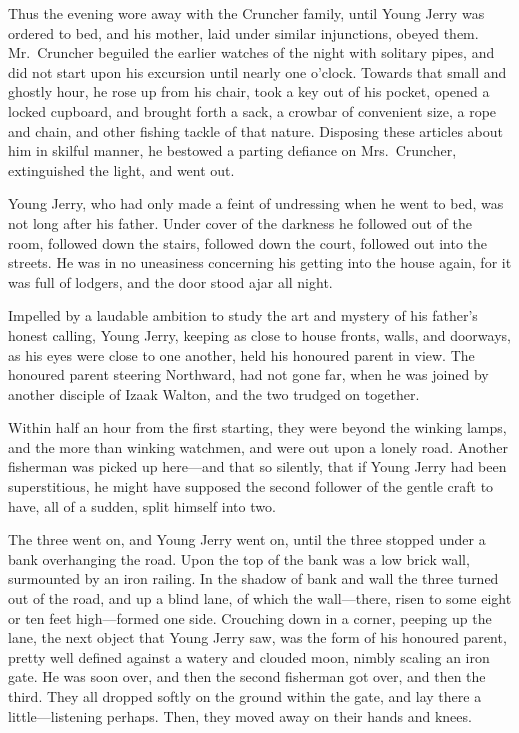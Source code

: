 Thus the evening wore away with the Cruncher family, until Young Jerry
was ordered to bed, and his mother, laid under similar injunctions,
obeyed them.  Mr.\ Cruncher beguiled the earlier watches of the night
with solitary pipes, and did not start upon his excursion until nearly
one o'clock.  Towards that small and ghostly hour, he rose up from his
chair, took a key out of his pocket, opened a locked cupboard, and
brought forth a sack, a crowbar of convenient size, a rope and chain,
and other fishing tackle of that nature.  Disposing these articles about
him in skilful manner, he bestowed a parting defiance on Mrs.\ Cruncher,
extinguished the light, and went out.

Young Jerry, who had only made a feint of undressing when he went to bed,
was not long after his father.  Under cover of the darkness he followed
out of the room, followed down the stairs, followed down the court,
followed out into the streets.  He was in no uneasiness concerning
his getting into the house again, for it was full of lodgers, and the
door stood ajar all night.

Impelled by a laudable ambition to study the art and mystery of his
father's honest calling, Young Jerry, keeping as close to house fronts,
walls, and doorways, as his eyes were close to one another, held his
honoured parent in view.  The honoured parent steering Northward,
had not gone far, when he was joined by another disciple of
Izaak Walton, and the two trudged on together.

Within half an hour from the first starting, they were beyond the
winking lamps, and the more than winking watchmen, and were out upon
a lonely road.  Another fisherman was picked up here---and that so
silently, that if Young Jerry had been superstitious, he might have
supposed the second follower of the gentle craft to have, all of a
sudden, split himself into two.

The three went on, and Young Jerry went on, until the three stopped
under a bank overhanging the road.  Upon the top of the bank was a
low brick wall, surmounted by an iron railing.  In the shadow of bank
and wall the three turned out of the road, and up a blind lane, of which
the wall---there, risen to some eight or ten feet high---formed one side.
Crouching down in a corner, peeping up the lane, the next object that
Young Jerry saw, was the form of his honoured parent, pretty well
defined against a watery and clouded moon, nimbly scaling an iron
gate.  He was soon over, and then the second fisherman got over, and
then the third.  They all dropped softly on the ground within the gate,
and lay there a little---listening perhaps.  Then, they moved away on
their hands and knees.

